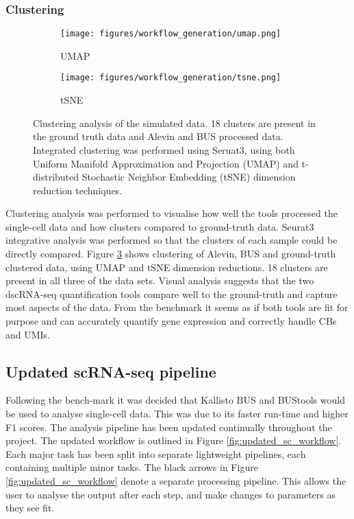 \subsubsection{Clustering}

\begin{figure}[ht]
\centering
\begin{subfigure}{0.7\textwidth}
    \texttt{[image: figures/workflow\_generation/umap.png]}
    \caption{UMAP}
    \label{fig:benchmark_UMAP}
\end{subfigure}
\medskip
\begin{subfigure}{0.7\textwidth}
    \texttt{[image: figures/workflow\_generation/tsne.png]}
    \caption{tSNE}
    \label{fig:benchmark_tsne}
\end{subfigure}
\caption[Benchmark Clustering Analysis]{Clustering analysis of the simulated data.
18 clusters are present in the ground truth data and Alevin and BUS processed data.
Integrated clustering was performed using Seruat3\cite{stuart2019comprehensive}, using both Uniform Manifold Approximation and Projection (UMAP) and  t-distributed Stochastic Neighbor Embedding (tSNE) dimension reduction techniques.}
\label{fig:benchmark_clustering}
\end{figure}

Clustering analysis was performed to visualise how well the tools processed the single-cell data and how clusters compared to ground-truth data.
Seurat3 integrative analysis was performed so that the clusters of each sample could be directly compared.
Figure \ref{fig:benchmark_clustering} shows clustering of Alevin, BUS and ground-truth clustered data, using UMAP and tSNE dimension reductions.
18 clusters are present in all three of the data sets.
Visual analysis suggests that the two dscRNA-seq quantification tools compare well to the ground-truth and capture most aspects of the data.
From the benchmark it seems as if both tools are fit for purpose and can accurately quantify gene expression and correctly handle CBs and UMIs.

\afterpage{\clearpage}


\subsection{Updated scRNA-seq pipeline}\label{subsec:updated_scrna}
Following the bench-mark it was decided that Kallisto BUS and BUStools would be used to analyse single-cell data.
This was due to its faster run-time and higher F1 scores.
The analysis pipeline has been updated continually throughout the project.
The updated workflow is outlined in Figure \ref{fig:updated_sc_workflow}.
Each major task has been split into separate lightweight pipelines, each containing multiple minor tasks.
The black arrows in Figure \ref{fig:updated_sc_workflow} denote a separate processing pipeline.
This allows the user to analyse the output after each step, and make changes to parameters as they see fit.

